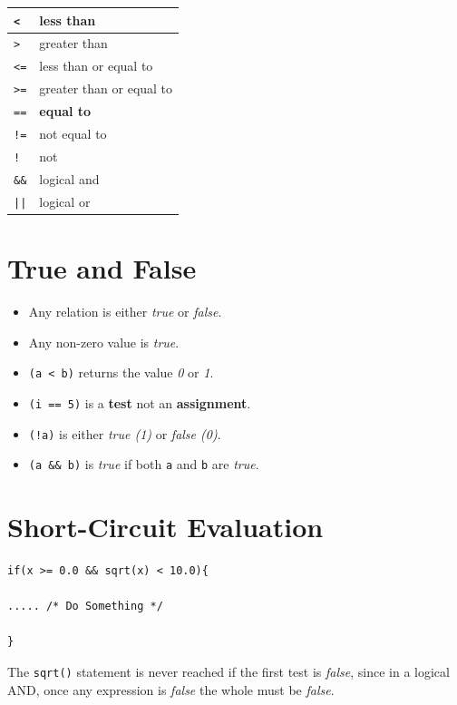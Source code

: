 \documentclass[a4,portraitt]{slides}
\begin{document}
\begin{center}
\begin{tabular}{|l|l|} \hline
\verb^<^    & less than             \\ \hline
\verb^>^    & greater than          \\ \hline
\verb^<=^   & less than or equal to     \\ \hline
\verb^>=^   & greater than or equal to  \\ \hline
\verb^==^   & {\bf equal to}        \\ \hline
\verb^!=^   & not equal to          \\ \hline
\verb^!^    & not               \\ \hline
\verb^&&^   & logical and           \\ \hline
\verb^||^   & logical or            \\ \hline
\end{tabular}
\end{center}

\newpage
\section*{True and False}

\begin{itemize}
\item Any relation is either {\it true} or {\it false}.
\item Any non-zero value is {\it true}.
\item \verb^(a < b)^ returns the value {\it 0} or {\it 1}.
\item \verb^(i == 5)^ is a {\bf test} not an {\bf assignment}.
\item \verb^(!a)^ is either {\it true (1)} or {\it false (0)}.
\item \verb^(a && b)^ is {\it true} if both \verb^a^ and \verb^b^ are {\it true}.
\end{itemize}

\newpage
\section*{Short-Circuit Evaluation}

\begin{verbatim}
if(x >= 0.0 && sqrt(x) < 10.0){

..... /* Do Something */

}
\end{verbatim}

The \verb^sqrt()^ statement is never reached if the first test is {\it false},
since in a logical AND, once any expression is {\it false} the whole must
be {\it false}.
\end{document}
